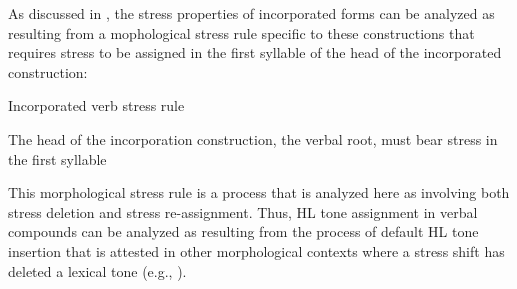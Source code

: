     \z
\z

As discussed in , the stress properties of incorporated forms can be analyzed as resulting from a mophological stress rule specific to these constructions that requires stress to be assigned in the first syllable of the head of the incorporated construction:

\ea\label{ex: incorporation stress rule}
{Incorporated verb stress rule}\mbox{}

{The head of the incorporation construction, the verbal root, must bear stress in the first syllable}\\
\z

This morphological stress rule is a process that is analyzed here as involving both stress deletion and stress re-assignment. Thus, HL tone assignment in verbal compounds can be analyzed as resulting from the process of default HL tone insertion that is attested in other morphological contexts where a stress shift has deleted a lexical tone (e.g., ).

